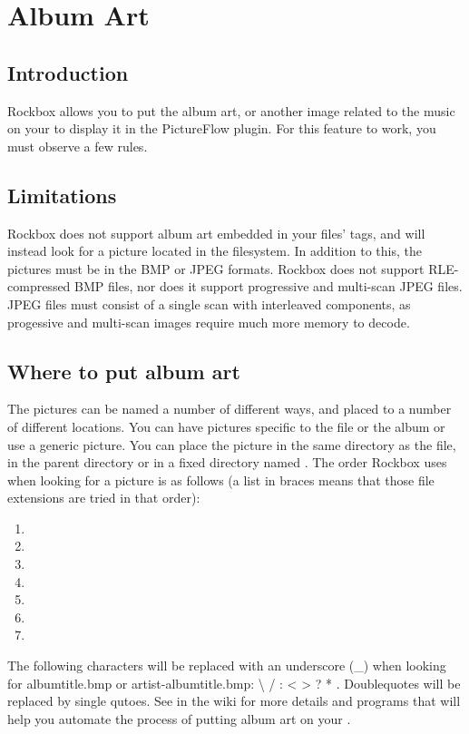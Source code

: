 \chapter{\label{ref:album_art}Album Art}
\section{Introduction}

Rockbox allows you to put the album art, or another image related to the music
on your \dap to display it in the PictureFlow plugin. For this feature to work, you must observe a few rules.

\section{Limitations}

Rockbox does not support album art embedded in your files' tags, and will
instead look for a picture located in the filesystem. In addition to this, the
pictures must be in the BMP or JPEG formats. Rockbox does not support
RLE-compressed BMP files, nor does it support progressive and multi-scan
JPEG files. JPEG files must consist of a single scan with interleaved components, 
as progessive and multi-scan images require much more memory to decode.

\section{Where to put album art}

The pictures can be named a number of different ways, and placed to a number of
different locations. You can have pictures specific to the file or the album
or use a generic picture. You can place the picture in the same directory
as the file, in the parent directory or in a fixed directory named
. The order Rockbox uses when looking for a picture
is as follows (a list in braces means that those file extensions are tried in
that order):

\begin{enumerate}
\item  {}
\item  {}
\item  {}
\item  {}
\item  {}
\item  {}
\item  {}
\end{enumerate}

The following characters will be replaced with an underscore (\_) when looking
for albumtitle.bmp or artist-albumtitle.bmp: \textbackslash{} / : \textless{}
\textgreater{} ? * \textbar{}. Doublequotes will be replaced by single qutoes.
See  in the wiki for more details and programs that will
help you automate the process of putting album art on your \dap{}.
